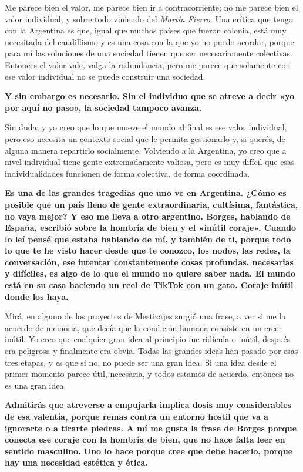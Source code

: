 \documentclass[11pt,a4paper]{article}
\newcommand{\preg}[1]{\textbf{#1}}
\begin{document}
Me parece bien el valor, me parece bien ir a contracorriente; no me parece bien el valor individual, y sobre todo viniendo del \emph{Martín Fierro}. Una crítica que tengo con la Argentina es que, igual que muchos países que fueron colonia, está muy necesitada del caudillismo y es una cosa con la que yo no puedo acordar, porque para mí las soluciones de una sociedad tienen que ser necesariamente colectivas. Entonces el valor vale, valga la redundancia, pero me parece que solamente con ese valor individual no se puede construir una sociedad.

\preg{Y sin embargo es necesario. Sin el individuo que se atreve a decir «yo por aquí no paso», la sociedad tampoco avanza.}

Sin duda, y yo creo que lo que mueve el mundo al final es ese valor individual, pero eso necesita un contexto social que le permita gestionarlo y, si querés, de alguna manera repartirlo socialmente. Volviendo a la Argentina, yo creo que a nivel individual tiene gente extremadamente valiosa, pero es muy difícil que esas individualidades funcionen de forma colectiva, de forma coordinada.

\preg{Es una de las grandes tragedias que uno ve en Argentina. ¿Cómo es posible que un país lleno de gente extraordinaria, cultísima, fantástica, no vaya mejor? Y eso me lleva a otro argentino. Borges, hablando de España, escribió sobre la hombría de bien y el «inútil coraje». Cuando lo leí pensé que estaba hablando de mí, y también de ti, porque todo lo que te he visto hacer desde que te conozco, los nodos, las redes, la conversación, ese intentar constantemente cosas profundas, necesarias y difíciles, es algo de lo que el mundo no quiere saber nada. El mundo está en su casa haciendo un reel de TikTok con un gato. Coraje inútil donde los haya.}

Mirá, en alguno de los proyectos de Mestizajes surgió una frase, a ver si me la acuerdo de memoria, que decía que la condición humana consiste en un creer inútil. Yo creo que cualquier gran idea al principio fue ridícula o inútil, después era peligrosa y finalmente era obvia. Todas las grandes ideas han pasado por esas tres etapas, y es que si no, no puede ser una gran idea. Si una idea desde el primer momento parece útil, necesaria, y todos estamos de acuerdo, entonces no es una gran idea.

\preg{Admitirás que atreverse a empujarla implica dosis muy considerables de esa valentía, porque remas contra un entorno hostil que va a ignorarte o a tirarte piedras. A mí me gusta la frase de Borges porque conecta ese coraje con la hombría de bien, que no hace falta leer en sentido masculino. Uno lo hace porque cree que debe hacerlo, porque hay una necesidad estética y ética.}
\end{document}
